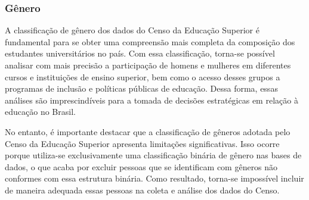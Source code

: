 \documentclass[12pt]{article}
\begin{document}



\subsubsection{Gênero}
\label{subsubsec:genero}

A classificação de gênero dos dados do Censo da Educação Superior é fundamental para se obter uma compreensão mais completa da composição dos estudantes universitários no país. Com essa classificação, torna-se possível analisar com mais precisão a participação de homens e mulheres em diferentes cursos e instituições de ensino superior, bem como o acesso desses grupos a programas de inclusão e políticas públicas de educação. Dessa forma, essas análises são imprescindíveis para a tomada de decisões estratégicas em relação à educação no Brasil.

No entanto, é importante destacar que a classificação de gêneros adotada pelo Censo da Educação Superior apresenta limitações significativas. Isso ocorre porque utiliza-se exclusivamente uma classificação binária de gênero nas bases de dados, o que acaba por excluir pessoas que se identificam com gêneros não conformes com essa estrutura binária. Como resultado, torna-se impossível incluir de maneira adequada essas pessoas na coleta e análise dos dados do Censo.
\end{document}
